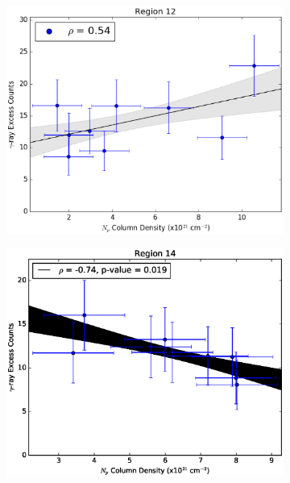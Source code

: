 \documentclass[12pt,a4paper]{article}
\begin{document}
\begin{figure}[H]
\begin{subfigure}{0.5\textwidth}
		\includegraphics[width=0.95\linewidth, height=0.25\textheight]{gamma_mHI_reg12}
	\end{subfigure}
	\begin{subfigure}{0.5\textwidth}
		\centering
		\includegraphics[width=0.9\linewidth, height=0.25\textheight]{gamma_mHI_reg14}
	\end{subfigure}
	\begin{subfigure}{0.5\textwidth}
		\centering

\end{subfigure}
\end{figure}
\end{document}
